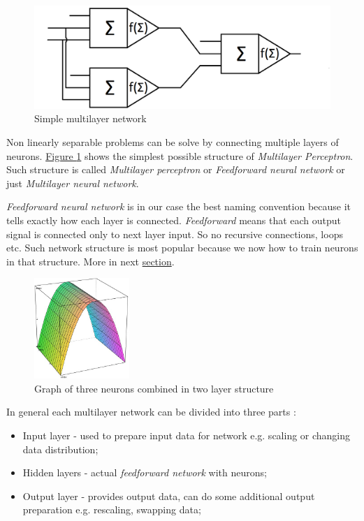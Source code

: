 \begin{figure}[!h]
    \centering
    \includegraphics[scale=0.2]{Media/MLN.png}
    \caption[Multilayer network]{Simple multilayer network}
    \label{fig:MLN}
\end{figure}

Non linearly separable problems can be solve by connecting multiple layers of neurons. \hyperref[fig:MLN]{Figure \ref{fig:MLN}} shows the simplest possible structure of \textit{Multilayer Perceptron}. Such structure is called \textit{Multilayer perceptron} or \textit{Feedforward neural network} or just \textit{Multilayer neural network}.

\textit{Feedforward neural network} is in our case the best naming convention because it tells exactly how each layer is connected. \textit{Feedforward} means that each output signal is connected only to next layer input. So no recursive connections, loops etc. Such network structure is most popular because we now how to train neurons in that structure. More in next \hyperref[sec:Training]{section}.

\begin{figure}
    \includegraphics[width=0.32\textwidth]{Media/Bridge.png}
    \caption{Graph of three neurons combined in two layer structure}
    \label{fig:BridgeGraph}
\end{figure}

In general each multilayer network can be divided into three parts \cite{mlpFSaC,fsmlpDwrSkrMk,mlpPawelRosczak}:
\begin{itemize}
    \item \label{InputLayer} Input layer - used to prepare input data for network e.g. scaling or changing data distribution;
    \item \label{HiddenLayer} Hidden layers - actual \textit{feedforward network} with neurons; 
    \item \label{OutputLayer} Output layer - provides output data, can do some additional output preparation e.g. rescaling, swapping data;
\end{itemize}


